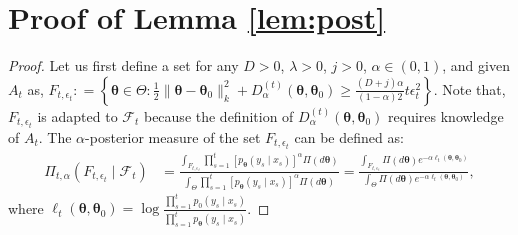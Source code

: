 \documentclass[final,12pt]{colt2026} %
\begin{document}
\section{Proof of Lemma \ref{lem:post}
}\label{app:Post}
\begin{proof}
    Let us first define a set for any $D>0$, $\lambda>0$, $j>0$, $\alpha\in(0,1)$, and given $A_t$ as,
 \(   F_{t,\epsilon_t} : = \left\{\pmb \theta \in \Theta: \frac{1}{2} \|\pmb \theta -\pmb \theta_0\|_k^2 + D_{\alpha}^{(t)}(\pmb \theta,\pmb \theta_0) \geq \frac{(D+j)\alpha}{(1-\alpha)2} t\epsilon_t^2  \right\}.\)
Note that, $F_{t,\epsilon_t}$ is adapted to $\mathcal{F}_t$ because the definition of $D_{\alpha}^{(t)}(\pmb \theta,\pmb \theta_0)$ requires knowledge of $A_t$. The $\alpha$-posterior measure of the set $F_{t,\epsilon_t}$ can be defined as:
\begin{align}
\Pi_{t,\alpha}(F_{t,\epsilon_t} \mid \mathcal{F}_t)&= \frac{ \int_{F_{t,\epsilon_t}}  \prod_{s=1}^{t} [p_{\pmb \theta}(y_s \mid x_s)]^{\alpha}\Pi(d\pmb \theta) } { \int_\Theta  \prod_{s=1}^{t} [p_{\pmb \theta}(y_s \mid x_s)]^{\alpha} \Pi(d\pmb \theta)  }
    = \frac{\int_{F_{t,\epsilon_t}} \Pi(d\pmb \theta) e^{-\alpha \ell_{t}(\pmb \theta,\pmb \theta_0)} } {\int_{\Theta} \Pi(d\pmb \theta) e^{-\alpha \ell_{t}(\pmb \theta,\pmb \theta_0)} },
    \label{eq:MABDE3}
\end{align}
where $\ell_{t}(\pmb \theta,\pmb \theta_0)= \log \frac{\prod_{s=1}^{t} p_0(y_s \mid x_s)}{\prod_{s=1}^{t} p_{\pmb \theta}(y_s \mid x_s) }$.

\end{proof}
\end{document}
